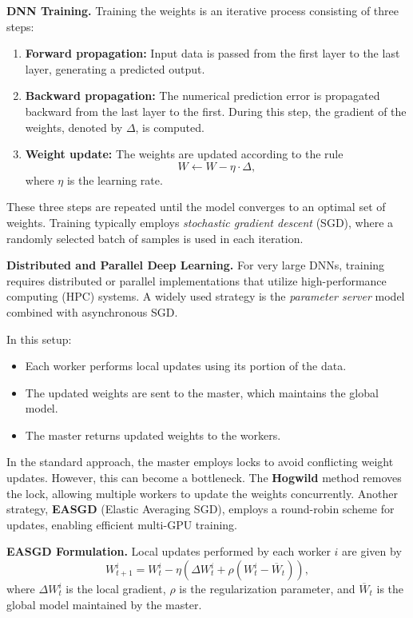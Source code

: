 \documentclass[12pt]{book}
\begin{document}
\textbf{DNN Training.}  
Training the weights is an iterative process consisting of three steps:  

\begin{enumerate}
    \item \textbf{Forward propagation:} Input data is passed from the first layer to the last layer, generating a predicted output.
    \item \textbf{Backward propagation:} The numerical prediction error is propagated backward from the last layer to the first. During this step, the gradient of the weights, denoted by $\Delta$, is computed.
    \item \textbf{Weight update:} The weights are updated according to the rule
    \[
    W \leftarrow W - \eta \cdot \Delta,
    \]
    where $\eta$ is the learning rate.
\end{enumerate}

These three steps are repeated until the model converges to an optimal set of weights. Training typically employs \emph{stochastic gradient descent} (SGD), where a randomly selected batch of samples is used in each iteration.

\textbf{Distributed and Parallel Deep Learning.}  
For very large DNNs, training requires distributed or parallel implementations that utilize high-performance computing (HPC) systems. A widely used strategy is the \emph{parameter server} model combined with asynchronous SGD.  

In this setup:
\begin{itemize}
    \item Each worker performs local updates using its portion of the data.
    \item The updated weights are sent to the master, which maintains the global model.
    \item The master returns updated weights to the workers.
\end{itemize}

In the standard approach, the master employs locks to avoid conflicting weight updates. However, this can become a bottleneck. The \textbf{Hogwild} method removes the lock, allowing multiple workers to update the weights concurrently. Another strategy, \textbf{EASGD} (Elastic Averaging SGD), employs a round-robin scheme for updates, enabling efficient multi-GPU training.

\textbf{EASGD Formulation.}  
Local updates performed by each worker $i$ are given by
\[
W_{t+1}^i = W_t^i - \eta \left(\Delta W_t^i + \rho(W_t^i - \overline{W}_t)\right),
\]
where $\Delta W_t^i$ is the local gradient, $\rho$ is the regularization parameter, and $\overline{W}_t$ is the global model maintained by the master.
\end{document}
